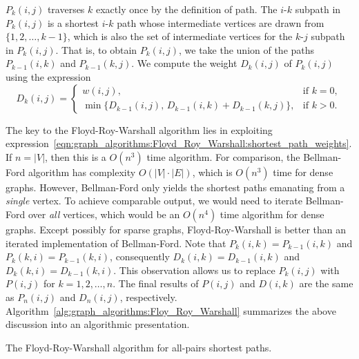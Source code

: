 $P_k(i,j)$ traverses $k$ exactly once by the definition of path. The
$i$-$k$ subpath in $P_k(i,j)$ is a shortest $i$-$k$ path whose
intermediate vertices are drawn from $\{1, 2, \dots, k-1\}$, which is
also the set of intermediate vertices for the $k$-$j$ subpath in
$P_k(i,j)$. That is, to obtain $P_k(i,j)$, we take the union of the
paths $P_{k-1}(i,k)$ and $P_{k-1}(k,j)$. We compute the weight
$D_k(i,j)$ of $P_k(i,j)$ using the expression
\begin{equation}
\label{eqn:graph_algorithms:Floyd_Roy_Warshall:shortest_path_weights}
D_k(i,j)
=
\begin{cases}
w(i,j), & \text{if $k = 0$}, \\[4pt]
\min\{D_{k-1}(i,j),\, D_{k-1}(i,k) + D_{k-1}(k,j)\}, & \text{if $k > 0$}.
\end{cases}
\end{equation}

The key to the Floyd-Roy-Warshall
algorithm lies in exploiting
expression~\eqref{eqn:graph_algorithms:Floyd_Roy_Warshall:shortest_path_weights}.
If $n = |V|$, then this is a $O(n^3)$ time algorithm. For
comparison, the Bellman-Ford algorithm
has complexity $O(|V| \cdot |E|)$, which is $O(n^3)$ time for dense
graphs. However, Bellman-Ford only yields the
shortest paths emanating from a \emph{single} vertex. To achieve
comparable output, we would need to iterate Bellman-Ford over
\emph{all} vertices, which would be an  $O(n^4)$ time algorithm for
dense graphs. Except possibly for sparse
graphs,
Floyd-Roy-Warshall is better than
an iterated implementation of Bellman-Ford. Note that
$P_k(i,k) = P_{k-1}(i,k)$ and $P_k(k,i) = P_{k-1}(k,i)$, consequently
$D_k(i,k) = D_{k-1}(i,k)$ and $D_k(k,i) = D_{k-1}(k,i)$. This
observation allows us to replace $P_k(i,j)$ with $P(i,j)$ for
$k = 1, 2, \dots, n$. The final results of $P(i,j)$ and $D(i,k)$ are
the same as $P_n(i,j)$ and $D_n(i,j)$,
respectively. Algorithm~\ref{alg:graph_algorithms:Floy_Roy_Warshall}
summarizes the above discussion into an algorithmic presentation.

\begin{algorithm}[!htbp]

\caption{The Floyd-Roy-Warshall algorithm for all-pairs shortest paths.}
\label{alg:graph_algorithms:Floy_Roy_Warshall}
\end{algorithm}

